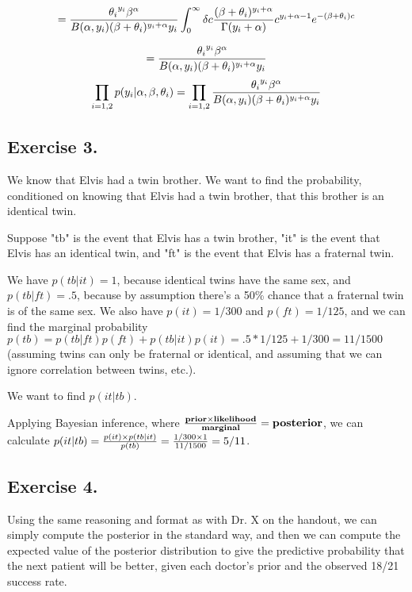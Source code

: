 \documentclass{article}
\begin{document}
\[= { {\theta_i}^{y_i} \beta^{\alpha} \over B(\alpha, y_{i}) (\beta + \theta_i)^{y_i + \alpha}y_{i}} 
\int_{0}^{\infty} \delta c  {(\beta + \theta_i)^{y_i + \alpha} \over \Gamma(y_{i} + \alpha)} c^{y_i + \alpha - 1}e^{-(\beta + \theta_i)c}\]

\[ = { {\theta_i}^{y_i} \beta^{\alpha} \over B(\alpha, y_{i}) (\beta + \theta_i)^{y_i + \alpha}y_{i}}\]
\begin{equation}
\prod_{i=1,2} p(y_i \vert \alpha, \beta, \theta_i) = \prod_{i=1,2} { {\theta_i}^{y_i} \beta^{\alpha} \over B(\alpha, y_{i}) (\beta + \theta_i)^{y_i + \alpha}y_{i}}
\end{equation}

\subsection{Exercise 3.}

We know that Elvis had a twin brother. We 
want to find the probability, conditioned on knowing
that Elvis had a twin brother, that this brother is an identical twin.

Suppose "tb" is the event that Elvis has a twin brother,
"it" is the event that Elvis has an identical twin, and "ft"
is the event that Elvis has a fraternal twin.

We have \(p(tb \vert it) = 1\), because 
identical twins have the same sex, and \(p(tb \vert ft) = .5\), because 
by assumption there's a 50\% chance that a fraternal twin is
of the same sex. We also have \(p(it) = 1/300\) and \(p(ft) = 1/125\),
and we can find the marginal probability 
\(p(tb) = p(tb \vert ft)p(ft) + p(tb \vert it)p(it) = .5*1/125 + 1/300 = 11/1500\)
(assuming twins can only be fraternal or identical, and assuming
that we can ignore correlation between twins, etc.).

We want to find \(p(it \vert tb)\). 

Applying Bayesian inference, where \({\textbf{prior} \times \textbf{likelihood} \over \textbf{marginal}} = \textbf{posterior}\),
we can calculate \(p(it \vert tb) = {p(it) \times p(tb \vert it) \over p(tb)} = {1/300 \times 1 \over 11/1500} = 5/11\).

\subsection{Exercise 4.}

Using the same reasoning and format as with Dr. X on the handout,
we can simply compute the posterior in the standard way,
and then we can compute the expected value of the posterior distribution
to give the predictive probability that the next
patient will be better, given each doctor's prior and the observed 18/21 success rate.
\end{document}
